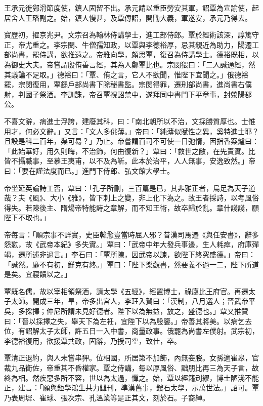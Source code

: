 \begin{pinyinscope}
 王承元徙鄭滑節度使，鎮人固留不出。承元請以重臣勞安其軍，詔覃為宣諭使，起居舍人王璠副之。始，鎮人慢甚，及覃傳詔，開勖大義，軍遂安，承元乃得去。



 寶歷初，擢京兆尹。文宗召為翰林侍講學士，進工部侍郎。覃於經術該深，諄篤守正，帝尤重之。李宗閔、牛僧孺知政，以覃與李德裕厚，忌其親近為助力，陽遷工部尚書，罷侍講，欲推遠之。帝雅向學，頗思覃，復召為侍講學士。德裕既相，以為御史大夫。帝嘗謂殷侑善言經，其為人鄭覃比也。宗閔猥曰：「二人誠通經，然其議論不足取。」德裕曰：「覃、侑之言，它人不欲聞，惟陛下宜聞之。」俄德裕罷，宗閔復用，覃繇戶部尚書下除秘書監。宗閔得罪，遷刑部尚書，進尚書右僕射，判國子祭酒。李訓誅，帝召覃視詔禁中，遂拜同中書門下平章事，封滎陽郡公。



 不喜文辭，病進士浮誇，建廢其科，曰：「南北朝所以不治，文採勝質厚也。士惟用才，何必文辭。」又言：「文人多佻薄。」帝曰：「純薄似賦性之異，奚特進士耶？且設是科二百年，渠可易？」乃止。帝嘗謂百司不可使一日弛惰，因指香案爐曰：「此始華好，用久則晦，不治飾，何由復新？」覃曰：「救世之敝，在先責實。比皆不攝職事，至慕王夷甫，以不及為靳。此本於治平，人人無事，安逸致然。」帝曰：「要在謹法度而已。」進門下侍郎、弘文館大學士。



 帝坐延英論詩工否，覃曰：「孔子所刪，三百篇是已，其非雅正者，烏足為天子道哉？夫《風》、大小《雅》，皆下刺上之變，非上化下為之。故王者採詩，以考風俗得失。若陳後主、隋煬帝特能詩之章解，而不知王術，故卒歸於亂。章什諓諓，願陛下不取也。」



 帝每言：「順宗事不詳實，史臣韓愈豈當時屈人邪？昔漢司馬遷《與任安書》，辭多怨懟，故《武帝本紀》多失實。」覃曰：「武帝中年大發兵事邊，生人耗瘁，府庫殫竭，遷所述非過言。」李石曰：「覃所陳，因武帝以諫，欲陛下終究盛德。」帝曰：「誠然。靡不有初，鮮克有終。」覃曰：「陛下樂觀書，然要義不過一二，陛下所道是矣。宜寢饋以之。」



 覃既名儒，故以宰相領祭酒，請太學《五經》，經置博士，祿廩比王府官。再遷太子太師。開成三年，旱，帝多出宮人，李玨入賀曰：「漢制，八月選人；晉武帝平吳，多採擇；仲尼所謂未見好德者。陛下以為無益，放之，盛德也。」覃又推贊曰：「晉以採擇之失，舉天下為左衽，宜陛下以為殷鑒。」帝善其將美。以病乞去位，有詔解太子太師，許五日一入中書，商量政事。俄罷為尚書左僕射。武宗初，李德裕復用，欲援覃共政，固辭，乃授司空，致仕，卒。



 覃清正退約，與人未嘗串狎。位相國，所居第不加飾，內無妾媵。女孫適崔皋，官裁九品衛佐，帝重其不昏權家。覃之侍講，每以厚風俗、黜朋比再三為天子言，故終為相。然疾惡多所不容，世以為太過，憚之。始，覃以經籍刓繆，博士陋淺不能正，建言：「願與鉅學鴻生共力讎刊，準漢舊事，鏤石太學，示萬世法。」詔可。覃乃表周墀、崔球、張次宗、孔溫業等是正其文，刻於石。子裔綽。




\end{pinyinscope}
